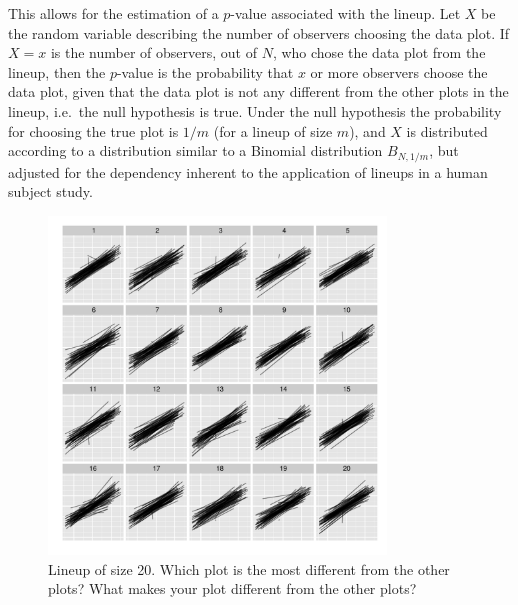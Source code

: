 \documentclass[12pt]{article} %
\newcommand{\hh}[1]{{\color{orange} #1}}
\newcommand{\al}[1]{{\color{ForestGreen} #1}}
\newcommand{\hhnote}[1]{\todo[inline,color=orange!40]{#1}}
\begin{document}
\hh{This  allows for the estimation of a $p$-value associated with the lineup.}
 Let $X$ be the random variable describing  the number  of observers choosing the data plot. 
If $X=x$ is  the number of observers, out of $N$, who chose the data plot from the lineup, then the  $p$-value is  the probability that   $x$ or more observers choose the data plot, given that the data plot is not any different from the other plots in the lineup, i.e.~the null hypothesis is true. Under the null hypothesis the probability for choosing the true plot is $1/m$ (for a lineup of size $m$), and $X$ is distributed according to a distribution similar to a Binomial distribution $B_{N, 1/m}$, \hh{but adjusted for the dependency inherent to the application of lineups in a human subject study.} 

\begin{figure}
	\centering
	\includegraphics[width=0.8\textwidth]{normexam_fanned_lineup16.pdf}
	\caption{\label{fig:fanned} Lineup of size 20. Which plot is the most different from the other plots? What makes your plot different from the other plots?
	}
\end{figure}
\end{document}
